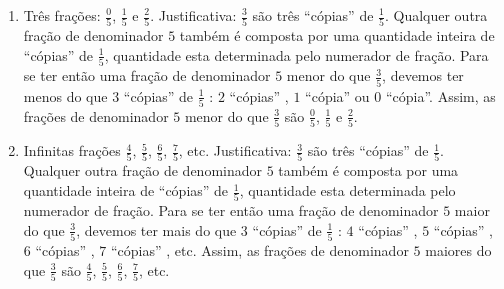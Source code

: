 \begin{atividade}
\solucao
\begin{enumerate} %
    \item       Três frações:       $\frac{0}{5}$,       $\frac{1}{5}$       e
    $\frac{2}{5}$. Justificativa:       $\frac{3}{5}$       são três
``cópias''       de       $\frac{1}{5}$. Qualquer outra fração de denominador
   $5$       também é composta por uma quantidade inteira de       ``cópias''
   de       $\frac{1}{5}$, quantidade esta determinada pelo numerador de fração.
Para se ter então uma fração de denominador       $5$       menor do que
$\frac{3}{5}$, devemos ter menos do que       $3$             ``cópias''
de       $\frac{1}{5}$      :       $2$             ``cópias''      ,       $1$
           ``cópia''       ou       $0$             ``cópia''. Assim, as
frações de denominador       $5$       menor do que       $\frac{3}{5}$
são       $\frac{0}{5}$,       $\frac{1}{5}$       e       $\frac{2}{5}$.
    \item       Infinitas frações       $\frac{4}{5}$,       $\frac{5}{5}$,
 $\frac{6}{5}$,       $\frac{7}{5}$, etc. Justificativa:       $\frac{3}{5}$
  são três       ``cópias''       de       $\frac{1}{5}$. Qualquer outra fração
de denominador       $5$       também é composta por uma quantidade inteira de
    ``cópias''       de       $\frac{1}{5}$, quantidade esta determinada pelo
numerador de fração. Para se ter então uma fração de denominador       $5$
maior do que       $\frac{3}{5}$, devemos ter mais do que       $3$
``cópias''       de       $\frac{1}{5}$      :       $4$             ``cópias''
    ,       $5$             ``cópias''      ,       $6$             ``cópias''
   ,       $7$             ``cópias''      , etc. Assim, as frações de
denominador       $5$       maiores do que       $\frac{3}{5}$       são
$\frac{4}{5}$,       $\frac{5}{5}$,       $\frac{6}{5}$,       $\frac{7}{5}$,
etc.
\end{enumerate} %

\end{atividade}

